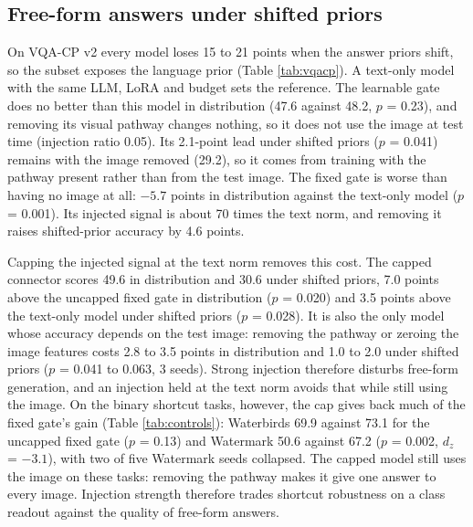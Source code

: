 \subsection{Free-form answers under shifted priors}

On VQA-CP v2 every model loses 15 to 21 points when the answer priors shift, so the subset exposes the language
prior (Table \ref{tab:vqacp}). A text-only model with the same LLM, LoRA and budget sets the reference. The learnable gate does no
better than this model in distribution (47.6 against 48.2, \(p\) = 0.23), and removing its visual pathway changes
nothing, so it does not use the image at test time (injection ratio 0.05). Its 2.1-point lead under shifted priors
(\(p\) = 0.041) remains with the image removed (29.2), so it comes from training with the pathway present rather
than from the test image. The fixed gate is worse than having no image at all: \(-5.7\) points in distribution
against the text-only model (\(p\) = 0.001). Its injected signal is about 70 times the text norm, and removing it
raises shifted-prior accuracy by 4.6 points.

Capping the injected signal at the text norm removes this cost. The capped connector scores 49.6 in distribution and
30.6 under shifted priors, 7.0 points above the uncapped fixed gate in distribution (\(p\) = 0.020) and 3.5 points
above the text-only model under shifted priors (\(p\) = 0.028). It is also the only model whose accuracy depends on
the test image: removing the pathway or zeroing the image features costs 2.8
to 3.5 points in distribution and 1.0 to 2.0 under shifted priors (\(p\) = 0.041 to 0.063, 3 seeds). Strong injection
therefore disturbs free-form generation, and an injection held at the text norm avoids that while still using the
image. On the binary shortcut tasks, however, the cap gives back much of the fixed gate's gain (Table \ref{tab:controls}): Waterbirds
69.9 against 73.1 for the uncapped fixed gate (\(p\) = 0.13) and Watermark 50.6 against 67.2 (\(p\) = 0.002, \(d_z\) =
\(-3.1\)), with two of five Watermark seeds collapsed. The capped model still uses the image on these tasks: removing
the pathway makes it give one answer to every image. Injection strength therefore trades shortcut robustness on a
class readout against the quality of free-form answers.

